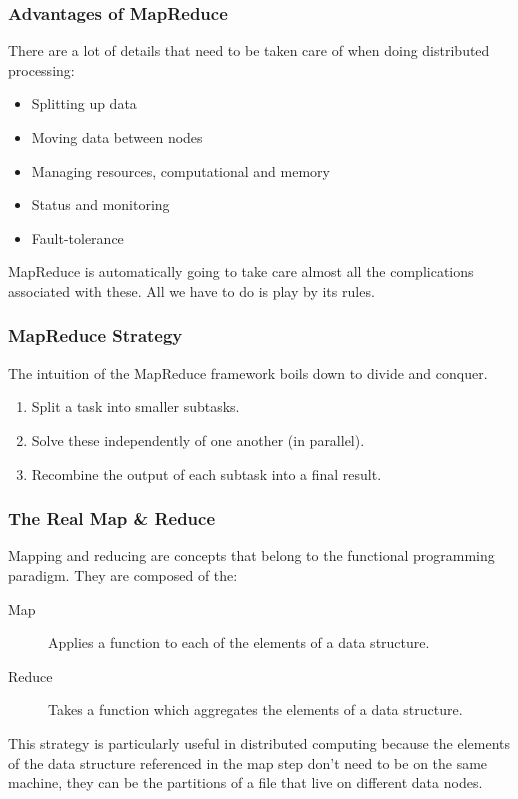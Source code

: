 \documentclass{beamer}
\begin{document}
\begin{frame}
  \frametitle{Advantages of MapReduce}
  There are a lot of details that need to be taken care of when doing distributed processing:
  \begin{itemize}
    \item Splitting up data
    \item Moving data between nodes
    \item Managing resources, computational and memory
    \item Status and monitoring
    \item Fault-tolerance
  \end{itemize} \pause

  \vspace{4mm}
  MapReduce is automatically going to take care almost all the complications associated with these. All we have to do is play by its rules.
\end{frame}

\begin{frame}
  \frametitle{MapReduce Strategy}
  The intuition of the MapReduce framework boils down to divide and conquer.

  \vspace{4mm}
  \begin{enumerate}
    \item Split a task into smaller subtasks.
    \item Solve these independently of one another (in parallel).
    \item Recombine the output of each subtask into a final result.
  \end{enumerate}
\end{frame}

\begin{frame}
  \frametitle{The Real Map \& Reduce}
  Mapping and reducing are concepts that belong to the functional programming paradigm. They are composed of the:

  \vspace{4mm}
  \begin{description}
    \item[Map] Applies a function to each of the elements of a data structure.
    \item[Reduce] Takes a function which aggregates the elements of a data structure.
  \end{description}

  \vspace{4mm}
  This strategy is particularly useful in distributed computing because the elements of the data structure referenced in the map step don't need to be on the same machine, they can be the partitions of a file that live on different data nodes.
\end{frame}
\end{document}
